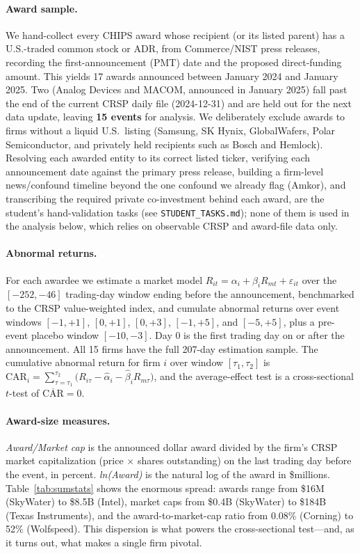 \documentclass[12pt]{article}
\begin{document}
\paragraph{Award sample.} We hand-collect every CHIPS award whose recipient (or its listed
parent) has a U.S.-traded common stock or ADR, from Commerce/NIST press releases, recording
the first-announcement (PMT) date and the proposed direct-funding amount. This yields 17
awards announced between January 2024 and January 2025. Two (Analog Devices and MACOM,
announced in January 2025) fall past the end of the current CRSP daily file (2024-12-31) and
are held out for the next data update, leaving \textbf{15 events} for analysis. We
deliberately exclude awards to firms without a liquid U.S.\ listing (Samsung, SK Hynix,
GlobalWafers, Polar Semiconductor, and privately held recipients such as Bosch and Hemlock).
Resolving each awarded entity to its correct listed ticker, verifying each announcement date
against the primary press release, building a firm-level news/confound timeline beyond the one
confound we already flag (Amkor), and transcribing the required private co-investment behind each
award, are the student's hand-validation tasks (see \texttt{STUDENT\_TASKS.md}); none of them is
used in the analysis below, which relies on observable CRSP and award-file data only.

\paragraph{Abnormal returns.} For each awardee we estimate a market model
$R_{it}=\alpha_i+\beta_i R_{mt}+\varepsilon_{it}$ over the $[-252,-46]$ trading-day window
ending before the announcement, benchmarked to the CRSP value-weighted index, and cumulate
abnormal returns over event windows $[-1,+1]$, $[0,+1]$, $[0,+3]$, $[-1,+5]$, and
$[-5,+5]$, plus a pre-event placebo window $[-10,-3]$. Day 0 is the first trading day on or
after the announcement. All 15 firms have the full 207-day estimation sample. The
cumulative abnormal return for firm $i$ over window $[\tau_1,\tau_2]$ is
$\text{CAR}_i=\sum_{\tau=\tau_1}^{\tau_2}\big(R_{i\tau}-\hat\alpha_i-\hat\beta_i R_{m\tau}\big)$,
and the average-effect test is a cross-sectional $t$-test of $\overline{\text{CAR}}=0$.

\paragraph{Award-size measures.} \emph{Award/Market cap} is the announced dollar award
divided by the firm's CRSP market capitalization (price $\times$ shares outstanding) on the
last trading day before the event, in percent. \emph{ln(Award)} is the natural log of the
award in \$millions. Table~\ref{tab:sumstats} shows the enormous spread: awards range from
\$16M (SkyWater) to \$8.5B (Intel), market caps from \$0.4B (SkyWater) to \$184B (Texas
Instruments), and the award-to-market-cap ratio from 0.08\% (Corning) to 52\% (Wolfspeed).
This dispersion is what powers the cross-sectional test---and, as it turns out, what makes a
single firm pivotal.
\end{document}

